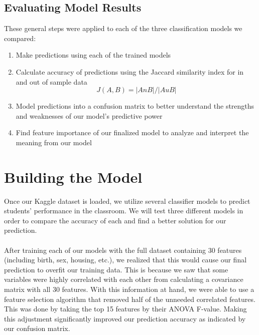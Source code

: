 \documentclass[twoside,twocolumn]{article}
\begin{document}
\subsection{Evaluating Model Results}
These general steps were applied to each of the three classification models we compared:
\begin{enumerate}
	\item Make predictions using each of the trained models
	\item Calculate accuracy of predictions using the Jaccard similarity index for in and out of sample data
	\begin{equation}
	\label{eq:emc}
	J(A,B) = |AnB|/|AuB|
	\end{equation}
	\item Model predictions into a confusion matrix to better understand the strengths and weaknesses of our model’s predictive power
	\item Find feature importance of our finalized model to analyze and interpret the meaning from our model
\end {enumerate}



\section{Building the Model}
Once our Kaggle dataset is loaded, we utilize several classifier models to predict students’ performance in the classroom. We will test three different models in order to compare the accuracy of each and find a better solution for our prediction. 
\\ \\
After training each of our models with the full dataset containing 30 features (including birth, sex, housing, etc.), we realized that this would cause our final prediction to overfit our training data. This is because we saw that some variables were highly correlated with each other from calculating a covariance matrix with all 30 features. With this information at hand, we were able to use a feature selection algorithm that removed half of the unneeded correlated features. This was done by taking the top 15 features by their ANOVA F-value. Making this adjustment significantly improved our prediction accuracy as indicated by our confusion matrix.
\end{document}
